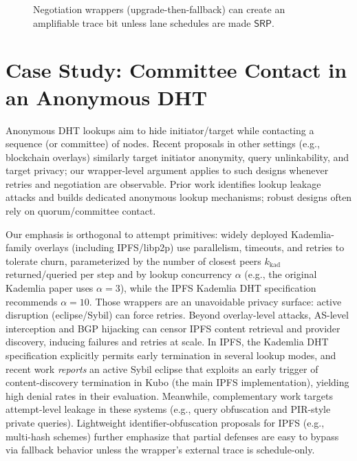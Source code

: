 \documentclass[11pt]{article}
\newcommand{\SRP}{\ensuremath{\mathsf{SRP}}}
\begin{document}
\begin{figure}[t]
  \centering
  \caption{Negotiation wrappers (upgrade-then-fallback) can create an amplifiable trace bit unless lane schedules are made \SRP.}
  \label{fig:controlplane}
\end{figure}

\section{Case Study: Committee Contact in an Anonymous DHT}
Anonymous DHT lookups aim to hide initiator/target while contacting a sequence (or committee) of nodes.
Recent proposals in other settings (e.g., blockchain overlays) similarly target initiator anonymity, query unlinkability, and target privacy; our wrapper-level argument applies to such designs whenever retries and negotiation are observable.\cite{tsengNCDHT2024}
Prior work identifies lookup leakage attacks and builds dedicated anonymous lookup mechanisms\cite{wangborisovLookupCCS2010,wangborisovOctopus2012}; robust designs often rely on quorum/committee contact\cite{backesQueryPrivacy2012}.

Our emphasis is orthogonal to attempt primitives: widely deployed Kademlia-family overlays (including IPFS/libp2p) use parallelism, timeouts, and retries to tolerate churn\cite{maymounkovMazieresKademlia2002}, parameterized by the number of closest peers $k_{\mathrm{kad}}$ returned/queried per step and by lookup concurrency $\alpha$ (e.g., the original Kademlia paper uses $\alpha=3$), while the IPFS Kademlia DHT specification recommends $\alpha=10$.\cite{maymounkovMazieresKademlia2002,ipfsKadDHTSpec2025}
Those wrappers are an unavoidable privacy surface: active disruption (eclipse/Sybil) can force retries\cite{singhEclipseInfocom2006,zhangEclipseInfeasible2011,ipfsContentCensorshipNDSS2024}.
Beyond overlay-level attacks, AS-level interception and BGP hijacking can censor IPFS content retrieval and provider discovery, inducing failures and retries at scale.\cite{matterTranIPFSCensorship2025}
In IPFS, the Kademlia DHT specification explicitly permits early termination in several lookup modes, and recent work \emph{reports} an active Sybil eclipse that exploits an early trigger of content-discovery termination in Kubo (the main IPFS implementation), yielding high denial rates in their evaluation.\cite{ipfsKadDHTSpec2025,ipfsActiveSybil2025}
Meanwhile, complementary work targets attempt-level leakage in these systems (e.g., query obfuscation and PIR-style private queries)\cite{danielKademliaObfuscation2025,mazmudarPeer2PIR2025}.
Lightweight identifier-obfuscation proposals for IPFS (e.g., multi-hash schemes) further emphasize that partial defenses are easy to bypass via fallback behavior unless the wrapper's external trace is schedule-only.\cite{katsantasTripleHashing2024,danielBitswapForwarding2023}
\end{document}
